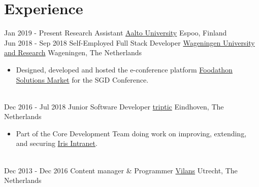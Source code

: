 \documentclass[letterpaper]{twentysecondcv} %
\begin{document}


\section{Experience}
\begin{twenty} %
    \twentyitem
    	{Jan 2019 -}
		{Present}
        {Research Assistant}
		{\href{https://aalto.fi}{Aalto University}}
        {Espoo, Finland}
        {
        }
        \\
    \twentyitem
    	{Jun 2018 -}
		{Sep 2018}
        {Self-Employed Full Stack Developer}
		{\href{https://wur.nl}{Wageningen University and Research}}
        {Wageningen, The Netherlands}
        {
        \begin{itemize}
			\item Designed, developed and hosted the e-conference platform \href{https://foodathon-solutionsmarket.com/}{Foodathon Solutions Market} for the SGD Conference.
        \end{itemize}
        }
        \\
    \twentyitem
    	{Dec 2016 -}
		{Jul 2018}
        {Junior Software Developer}
		{\href{http://triptic.nl}{triptic}}
        {Eindhoven, The Netherlands}
        {
        \begin{itemize}
            \item Part of the Core Development Team doing work on improving, extending, and securing \href{https://www.irisintranet.com/}{Iris Intranet}.
        \end{itemize}
        }
        \\
	\twentyitem
    	{Dec 2013 -}
		{Dec 2016}
		{Content manager \& Programmer}
		{\href{http://www.vilans.nl/}{Vilans}}
        {Utrecht, The Netherlands}
        {}
\end{twenty}
\end{document}
